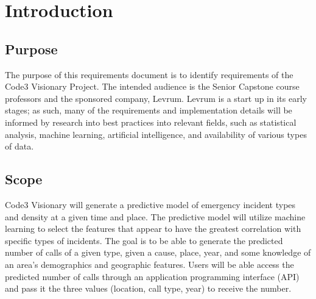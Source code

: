 \documentclass[onecolumn, draftclsnofoot,10pt, compsoc]{IEEEtran}
\begin{document}
\newpage
{}
\tableofcontents
\clearpage

\section{Introduction}
    \subsection{Purpose}
    The purpose of this requirements document is to identify requirements of the Code3 Visionary Project. 
    The intended audience is the Senior Capstone course professors and the sponsored company, Levrum. 
    Levrum is a start up in its early stages; as such, many of the requirements and implementation details will be informed by research into best practices into relevant fields, such as statistical analysis, machine learning, artificial intelligence, and availability of various types of data.
    
    \subsection{Scope}
    
    Code3 Visionary will generate a predictive model of emergency incident types and density at a given time and place. 
    The predictive model will utilize machine learning to select the features that appear to have the greatest correlation with specific types of incidents. 
    The goal is to be able to generate the predicted number of calls of a given type, given a cause, place, year, and some knowledge of an area's demographics and geographic features.
    Users will be able access the predicted number of calls through an application programming interface (API)  and pass it the three values (location, call type, year) to receive the number.
    
\end{document}
